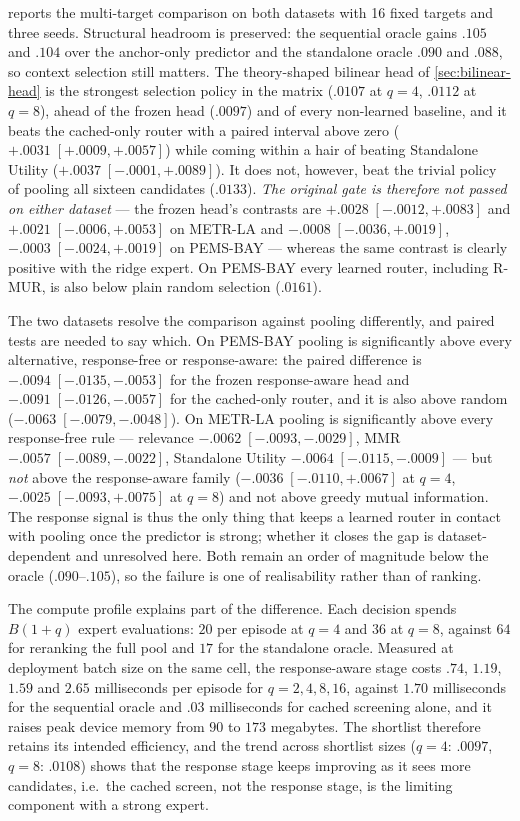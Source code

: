  reports the multi-target comparison on both
datasets with 16 fixed targets and three seeds. Structural headroom is
preserved: the sequential oracle gains $.105$ and $.104$ over the anchor-only
predictor and the standalone oracle $.090$ and $.088$, so context selection
still matters. The theory-shaped bilinear head of
\cref{sec:bilinear-head} is the strongest selection policy in the matrix
($.0107$ at $q=4$, $.0112$ at $q=8$), ahead of the frozen head ($.0097$) and of
every non-learned baseline, and it beats the cached-only router with a paired
interval above zero ($+.0031\;[+.0009,+.0057]$) while coming within a hair of
beating Standalone Utility ($+.0037\;[-.0001,+.0089]$). It does not, however,
beat the trivial policy of pooling all sixteen candidates ($.0133$).
\emph{The original gate is therefore not passed on either dataset} --- the frozen head's
contrasts are $+.0028\;[-.0012,+.0083]$ and $+.0021\;[-.0006,+.0053]$ on
METR-LA and $-.0008\;[-.0036,+.0019]$, $-.0003\;[-.0024,+.0019]$ on
PEMS-BAY --- whereas the same contrast is clearly positive with the ridge
expert. On PEMS-BAY every
learned router, including R-MUR, is also below plain random selection
($.0161$).

The two datasets resolve the comparison against pooling differently, and paired
tests are needed to say which. On PEMS-BAY pooling is significantly above every
alternative, response-free or response-aware: the paired difference is
$-.0094\;[-.0135,-.0053]$ for the frozen response-aware head and
$-.0091\;[-.0126,-.0057]$ for the cached-only router, and it is also above
random ($-.0063\;[-.0079,-.0048]$). On METR-LA pooling is significantly above
every response-free rule --- relevance $-.0062\;[-.0093,-.0029]$, MMR
$-.0057\;[-.0089,-.0022]$, Standalone Utility $-.0064\;[-.0115,-.0009]$ --- but
\emph{not} above the response-aware family ($-.0036\;[-.0110,+.0067]$ at $q=4$,
$-.0025\;[-.0093,+.0075]$ at $q=8$) and not above greedy mutual information.
The response signal is thus the only thing that keeps a learned router in
contact with pooling once the predictor is strong; whether it closes the gap is
dataset-dependent and unresolved here. Both remain an order of magnitude below
the oracle ($.090$--$.105$), so the failure is one of realisability rather than
of ranking.

The compute profile explains part of the difference. Each decision spends
$B(1+q)$ expert evaluations: $20$ per episode at $q=4$ and $36$ at $q=8$,
against $64$ for reranking the full pool and $17$ for the standalone oracle.
Measured at deployment batch size on the same cell, the response-aware stage
costs $.74$, $1.19$, $1.59$ and $2.65$ milliseconds per episode for
$q=2,4,8,16$, against $1.70$ milliseconds for the sequential oracle and $.03$
milliseconds for cached screening alone, and it raises peak device memory from
$90$ to $173$ megabytes. The shortlist therefore retains its intended
efficiency, and the trend across shortlist sizes ($q=4$: $.0097$, $q=8$:
$.0108$) shows that the response stage keeps improving as it sees more
candidates, i.e.\ the cached screen, not the response stage, is the limiting
component with a strong expert.

